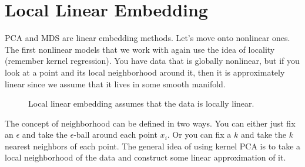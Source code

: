 \section{Local Linear Embedding} 

  PCA and MDS are linear embedding methods. Let's move onto nonlinear ones. The first nonlinear models that we work with again use the idea of locality (remember kernel regression). You have data that is globally nonlinear, but if you look at a point and its local neighborhood around it, then it is approximately linear since we assume that it lives in some smooth manifold. 

  \begin{figure}[H]
    \centering 
    \caption{Local linear embedding assumes that the data is locally linear. } 
    \label{fig:local_linear_embedding}
  \end{figure}

  The concept of neighborhood can be defined in two ways. You can either just fix an $\epsilon$ and take the $\epsilon$-ball around each point $x_i$. Or you can fix a $k$ and take the $k$ nearest neighbors of each point. The general idea of using kernel PCA is to take a local neighborhood of the data and construct some linear approximation of it. 

